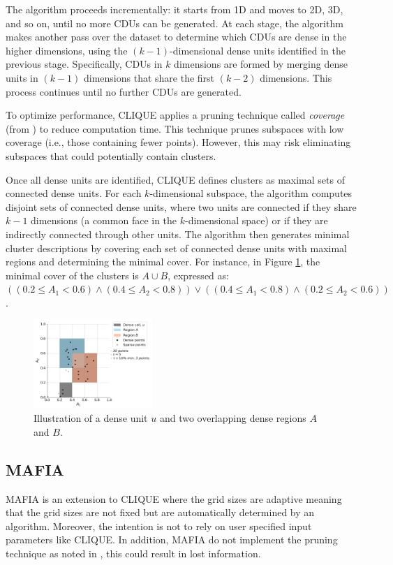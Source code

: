 The algorithm proceeds incrementally: it starts from 1D and moves to 2D, 3D, and so on, until no more CDUs can be generated. At each stage, the algorithm makes another pass over the dataset to determine which CDUs are dense in the higher dimensions, using the $(k-1)$-dimensional dense units identified in the previous stage. Specifically, CDUs in $k$ dimensions are formed by merging dense units in $(k-1)$ dimensions that share the first $(k-2)$ dimensions. This process continues until no further CDUs are generated.

To optimize performance, CLIQUE applies a pruning technique called \textit{coverage} (from \cite{clique}) to reduce computation time. This technique prunes subspaces with low coverage (i.e., those containing fewer points). However, this may risk eliminating subspaces that could potentially contain clusters.

Once all dense units are identified, CLIQUE defines clusters as maximal sets of connected dense units. For each $k$-dimensional subspace, the algorithm computes disjoint sets of connected dense units, where two units are connected if they share $k-1$ dimensions (a common face in the $k$-dimensional space) or if they are indirectly connected through other units. The algorithm then generates minimal cluster descriptions by covering each set of connected dense units with maximal regions and determining the minimal cover. For instance, in Figure \ref{fig:dense_cells_and_regions}, the minimal cover of the clusters is $A \cup B$, expressed as: $((0.2 \leq A_1 < 0.6) \land (0.4 \leq A_2 < 0.8)) \lor ((0.4 \leq A_1 < 0.8) \land (0.2 \leq A_2 < 0.6))$.
\begin{figure}[H]
    \vspace*{-0.5cm}
    \centering
    \includegraphics[width=0.4\textwidth]{figures/dense_cells_and_regions.png}
    \caption{Illustration of a dense unit $u$ and two overlapping dense regions $A$ and $B$.}
    \label{fig:dense_cells_and_regions}
    \vspace*{-0.5cm}
\end{figure}

\subsection{MAFIA}
MAFIA is an extension to CLIQUE where the grid sizes are adaptive meaning that the grid sizes are not fixed but are automatically determined by an algorithm. Moreover, the intention is not to rely on user specified input parameters like CLIQUE. In addition, MAFIA do not implement the pruning technique as noted in \cite{clique}, this could result in lost information.

